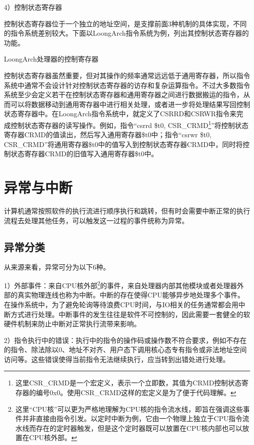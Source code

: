 \documentclass[]{ctexbook}
\begin{document}
4）控制状态寄存器

控制状态寄存器位于一个独立的地址空间，是支撑前面3种机制的具体实现，不同的指令系统差别较大。下面以LoongArch指令系统为例，列出其控制状态寄存器的功能。

\label{tab:la-csr}LoongArch处理器的控制寄存器

控制状态寄存器虽然重要，但对其操作的频率通常远远低于通用寄存器，所以指令系统中通常不会设计针对控制状态寄存器的访存和复杂运算指令。不过大多数指令系统至少会定义若干在控制状态寄存器和通用寄存器之间进行数据搬运的指令，从而可以将数据移动到通用寄存器中进行相关处理，或者进一步将处理结果写回控制状态寄存器中。在LoongArch指令系统中，就定义了CSRRD和CSRWR指令来完成控制状态寄存器的读写操作。例如，指令``csrrd \$t0, CSR\_CRMD\footnote{这里CSR\_CRMD是一个宏定义，表示一个立即数，其值为CRMD控制状态寄存器的编号0x0。使用CSR\_CRMD这样的宏定义是为了便于代码理解。}''将控制状态寄存器CRMD的值读出，然后写入通用寄存器\$t0中；指令``csrwr \$t0, CSR\_CRMD''将通用寄存器\$t0中的值写入到控制状态寄存器CRMD中，同时将控制状态寄存器CRMD的旧值写入通用寄存器\$t0中。

\hypertarget{sec-exception}{%
\section{异常与中断}\label{sec-exception}}

计算机通常按照软件的执行流进行顺序执行和跳转，但有时会需要中断正常的执行流程去处理其他任务，可以触发这一过程的事件统称为异常。

\hypertarget{ux5f02ux5e38ux5206ux7c7b}{%
\subsection{异常分类}\label{ux5f02ux5e38ux5206ux7c7b}}

从来源来看，异常可分为以下6种。

1）外部事件：来自CPU核外部\footnote{这里``CPU核''可以更为严格地理解为CPU核的指令流水线，即旨在强调这些事件并非直接由指令引发。以定时中断为例，它由一个物理上独立于CPU指令流水线而存在的定时器触发，但是这个定时器既可以放置在CPU核内部也可以放置在CPU核外部。}的事件，来自处理器内部其他模块或者处理器外部的真实物理连线也称为中断。中断的存在使得CPU能够异步地处理多个事件。在操作系统中，为了避免轮询等待浪费CPU时间，与IO相关的任务通常都会用中断方式进行处理。中断事件的发生往往是软件不可控制的，因此需要一套健全的软硬件机制来防止中断对正常执行流带来影响。

2）指令执行中的错误：执行中的指令的操作码或操作数不符合要求，例如不存在的指令、除法除以0、地址不对齐、用户态下调用核心态专有指令或非法地址空间访问等。这些错误使得当前指令无法继续执行，应当转到出错处进行处理。
\end{document}
